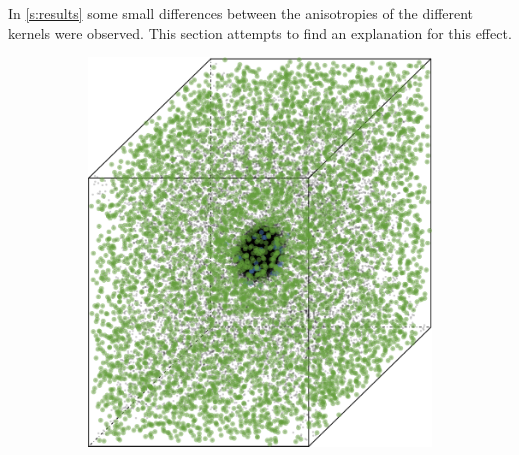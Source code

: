
	In \cref{s:results} some small differences between the anisotropies of the different kernels were observed. This section attempts to find an explanation for this effect.

			\begin{figure}
				\centering
				\begin{subfigure}{0.23\textwidth}
					\centering
					\includegraphics[keepaspectratio=true, width=\textwidth, height=0.23\textheight]{discussion/img/ferdosi_1_60000_anisotropy.png}
					\caption{}
					\label{fig:discussion:anisotropy:ferdosi1}
				\end{subfigure}
				\begin{subfigure}{0.23\textwidth}
					\centering

\end{subfigure}
\end{figure}
